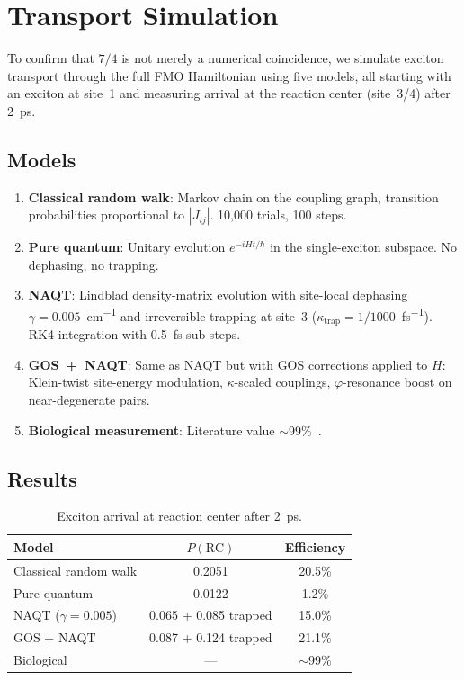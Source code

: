\documentclass[11pt,twocolumn]{article}
\begin{document}
\section{Transport Simulation}
\label{sec:transport}

To confirm that $7/4$ is not merely a numerical coincidence, we simulate
exciton transport through the full FMO Hamiltonian using five models,
all starting with an exciton at site~1 and measuring arrival at the
reaction center (site~3/4) after 2~ps.

\subsection{Models}

\begin{enumerate}
  \item \textbf{Classical random walk}: Markov chain on the coupling
        graph, transition probabilities proportional to $|J_{ij}|$.
        10{,}000 trials, 100 steps.
  \item \textbf{Pure quantum}: Unitary evolution $e^{-iH t/\hbar}$ in
        the single-exciton subspace.  No dephasing, no trapping.
  \item \textbf{NAQT}: Lindblad density-matrix evolution with
        site-local dephasing $\gamma = 0.005$~\si{cm^{-1}} and
        irreversible trapping at site~3 ($\kappa_{\mathrm{trap}} =
        1/1000$~\si{fs^{-1}}).  RK4 integration with 0.5~fs sub-steps.
  \item \textbf{GOS~+~NAQT}: Same as NAQT but with GOS corrections
        applied to $H$: Klein-twist site-energy modulation,
        $\kappa$-scaled couplings, $\varphi$-resonance boost on
        near-degenerate pairs.
  \item \textbf{Biological measurement}: Literature value
        $\sim$99\%~\cite{Engel2007,Panitchayangkoon2010}.
\end{enumerate}

\subsection{Results}

\begin{table}[H]
\centering
\caption{Exciton arrival at reaction center after 2~ps.}
\label{tab:transport}
\begin{tabular}{@{}lcc@{}}
\toprule
\textbf{Model} & $P(\mathrm{RC})$ & Efficiency \\
\midrule
Classical random walk & 0.2051 & 20.5\% \\
Pure quantum & 0.0122 & 1.2\% \\
NAQT ($\gamma = 0.005$) & 0.065 + 0.085 trapped & 15.0\% \\
GOS + NAQT & 0.087 + 0.124 trapped & 21.1\% \\
Biological & --- & $\sim$99\% \\
\bottomrule
\end{tabular}
\end{table}
\end{document}
